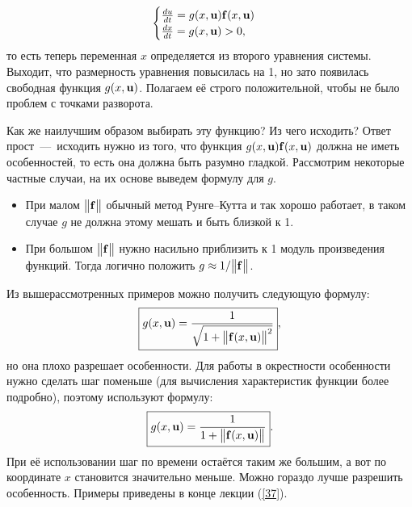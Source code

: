 \documentclass[a4,14pt,russian]{article}
\begin{document}
     \begin{equation}
        \begin{cases}
           \frac{du}{dt}=g(x,{\bf u}){\bf f}(x, {\bf u})\\
            \frac{dx}{dt}=g(x,{\bf u}) > 0,
        \end{cases}
    \end{equation}
    то есть теперь переменная $x$ определяется из второго уравнения системы. Выходит, что размерность уравнения повысилась на 1, но зато появилась свободная функция $g(x,{\bf u})$. Полагаем её строго положительной, чтобы не было проблем с точками разворота.\par
    Как же наилучшим образом выбирать эту функцию? Из чего исходить? Ответ прост~---~исходить нужно из того, что функция $g(x,{\bf u}){\bf f}(x, {\bf u})$ должна не иметь особенностей, то есть она должна быть разумно гладкой. Рассмотрим некоторые частные случаи, на их основе выведем формулу для $g$.
    \begin{itemize}
        \item При малом $\bigl\| {\bf f}\bigr\|$ обычный метод Рунге--Кутта и так хорошо работает, в таком случае $g$ не должна этому мешать и быть близкой к 1.
        \item При большом $\bigl\| {\bf f}\bigr\|$ нужно насильно приблизить к 1 модуль произведения функций. Тогда логично положить $g \approx 1/{\bigl\| {\bf f}\bigr\|}$.
    \end{itemize}
    Из вышерассмотренных примеров можно получить следующую формулу:
     \begin{equation}
       \boxed{ g(x,{\bf u}) = \frac{1}{\sqrt{1+\bigl\|{\bf f}(x, {\bf u})\bigr\|^2}}},
    \end{equation}
    но она плохо разрешает особенности. Для работы в окрестности особенности нужно сделать шаг поменьше (для вычисления характеристик функции более подробно), поэтому используют формулу:
    \begin{equation}
        \boxed{g(x,{\bf u}) = \frac{1}{1+\bigl\|{\bf f}(x, {\bf u})\bigr\|}}.
    \end{equation}
    При её использовании шаг по времени остаётся таким же большим, а вот по координате $x$ становится значительно меньше. Можно гораздо лучше разрешить особенность.
    Примеры приведены в конце лекции (\ref{37}).
\end{document}
